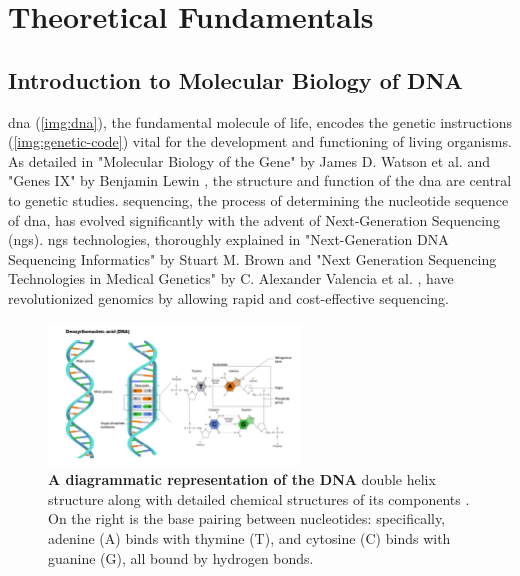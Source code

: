 \chapter{Theoretical Fundamentals} 

\section{Introduction to Molecular Biology of DNA}

\gls{dna} (\autoref{img:dna}), the fundamental molecule of life, encodes the genetic instructions (\autoref{img:genetic-code}) vital for the development and functioning of living organisms. As detailed in "Molecular Biology of the Gene" by James D. Watson et al. \cite{Watson2013} and "Genes IX" by Benjamin Lewin \cite{Lewin2007}, the structure and function of the \gls{dna} are central to genetic studies. \gls{sequencing}, the process of determining the nucleotide sequence of \gls{dna}, has evolved significantly with the advent of Next-Generation Sequencing (\gls{ngs}). \gls{ngs} technologies, thoroughly explained in "Next-Generation DNA Sequencing Informatics" by Stuart M. Brown \cite{Brown2013} and "Next Generation Sequencing Technologies in Medical Genetics" by C. Alexander Valencia et al. \cite{Valencia2013}, have revolutionized genomics by allowing rapid and cost-effective \gls{sequencing}.

\begin{figure}[ht]
  \centering
  \includegraphics[width=0.6\textwidth]{resources/images/DNA-transparent.png}
  \caption{\textbf{A diagrammatic representation of the DNA} double helix structure along with detailed chemical structures of its components \cite{NHGRI2024-DNA}. On the right is the base pairing between nucleotides: specifically, adenine (A) binds with thymine (T), and cytosine (C) binds with guanine (G), all bound by hydrogen bonds.}
  \label{img:dna}
\end{figure}

